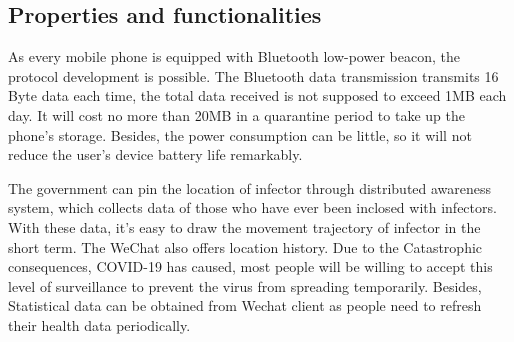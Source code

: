 \documentclass[11pt,en]{elegantpaper}
\begin{document}




\subsection{Properties and functionalities}
As every mobile phone is equipped with Bluetooth low-power beacon, the protocol development is possible. The Bluetooth data transmission transmits 16 Byte data each time, the total data received is not supposed to exceed 1MB each day. It will cost no more than 20MB in a quarantine period to take up the phone's storage. Besides, the power consumption can be little, so it will not reduce the user's device battery life remarkably.

The government can pin the location of infector through distributed awareness system, which collects data of those who have ever been inclosed with infectors. With these data, it's easy to draw the movement trajectory of infector in the short term. The WeChat also offers location history. Due to the Catastrophic consequences, COVID-19 has caused, most people will be willing to accept this level of surveillance to prevent the virus from spreading temporarily. Besides, Statistical data can be obtained from Wechat client as people need to refresh their health data periodically. 


\end{document}
